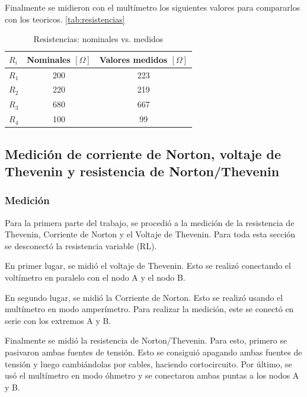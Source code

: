 \documentclass{article}
\begin{document}
        Finalmente se midieron con el multímetro los siguientes valores para compararlos con los teoricos. \autoref{tab:resistencias}\par
        
        \begin{table}[H]
            \centering
            \begin{tabular}{|l|c|c|}
            \hline
            $R_i$ & \multicolumn{1}{l|}{Nominales $ [\Omega] $} & \multicolumn{1}{l|}{Valores medidos $ [\Omega] $}\\ \hline
            $R_1$ & 200         & 223         \\ \hline
            $R_2$ & 220         & 219         \\ \hline
            $R_3$ & 680         & 667         \\ \hline
            $R_4$ & 100         & 99          \\ \hline
            \end{tabular}
            \caption{Resistencias: nominales vs. medidos}
            \label{tab:resistencias}
        \end{table}

        \subsection{Medición de corriente de Norton, voltaje de Thevenin y resistencia de Norton/Thevenin}
            \subsubsection{Medición}
                \quad Para la primera parte del trabajo, se procedió a la medición de la resistencia de Thevenin, Corriente de Norton y el Voltaje de Thevenin. Para toda esta sección se desconectó la resistencia variable (RL).\par
                En primer lugar, se midió el voltaje de Thevenin. Esto se realizó conectando el voltímetro en paralelo con el nodo A y el nodo B.\par
                En segundo lugar, se midió la Corriente de Norton. Esto se realizó usando el multímetro en modo amperímetro. Para realizar la medición, este se conectó en serie con los extremos A y B. \par
                Finalmente se midió la resistencia de Norton/Thevenin. Para esto, primero se  pasivaron ambas fuentes de tensión. Esto se consiguió apagando ambas fuentes de tensión y luego cambiándolas por cables, haciendo cortocircuito. Por último, se usó el multímetro en modo óhmetro y se conectaron ambas puntas a los nodos A y B.\par
\end{document}
